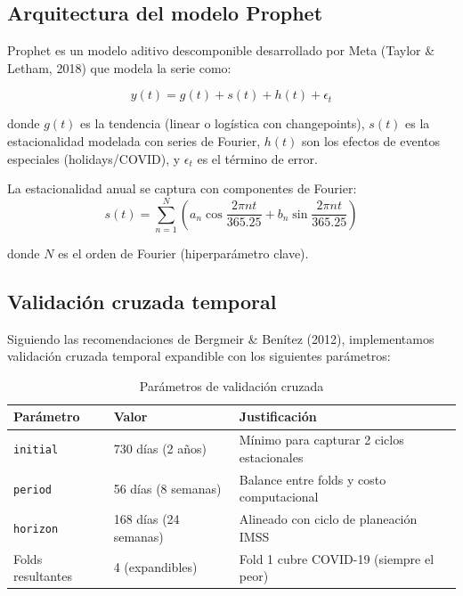 \documentclass[12pt, letterpaper]{article}
\begin{document}
\subsection{Arquitectura del modelo Prophet}

Prophet es un modelo aditivo descomponible desarrollado por Meta (Taylor \& Letham, 2018) que modela la serie como:

\begin{equation}
y(t) = g(t) + s(t) + h(t) + \epsilon_t
\end{equation}

donde $g(t)$ es la tendencia (linear o logística con changepoints), $s(t)$ es la estacionalidad modelada con series de Fourier, $h(t)$ son los efectos de eventos especiales (holidays/COVID), y $\epsilon_t$ es el término de error.

La estacionalidad anual se captura con componentes de Fourier:
\begin{equation}
s(t) = \sum_{n=1}^{N} \left( a_n \cos\frac{2\pi n t}{365.25} + b_n \sin\frac{2\pi n t}{365.25} \right)
\end{equation}

donde $N$ es el orden de Fourier (hiperparámetro clave).

\subsection{Validación cruzada temporal}

Siguiendo las recomendaciones de Bergmeir \& Benítez (2012), implementamos validación cruzada temporal expandible con los siguientes parámetros:

\begin{table}[H]
\centering
\caption{Parámetros de validación cruzada}
\label{tab:cv}
\begin{tabular}{lll}
\toprule
\textbf{Parámetro} & \textbf{Valor} & \textbf{Justificación} \\
\midrule
\texttt{initial}  & 730 días (2 años) & Mínimo para capturar 2 ciclos estacionales \\
\texttt{period}   & 56 días (8 semanas) & Balance entre folds y costo computacional \\
\texttt{horizon}  & 168 días (24 semanas) & Alineado con ciclo de planeación IMSS \\
Folds resultantes & 4 (expandibles)      & Fold 1 cubre COVID-19 (siempre el peor) \\
\bottomrule
\end{tabular}
\end{table}
\end{document}
